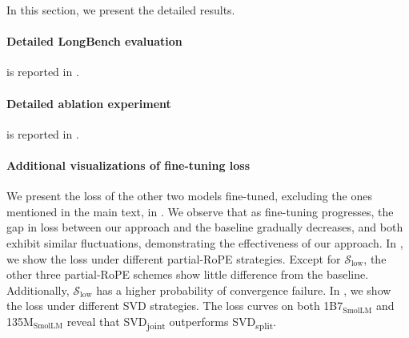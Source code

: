 
In this section, we present the detailed results. 
\paragraph{Detailed LongBench evaluation} is reported in .

\paragraph{Detailed ablation experiment} is reported in .

\paragraph{Additional visualizations of fine-tuning loss} 
We present the loss of the other two models fine-tuned, excluding the ones mentioned in the main text, in . 
We observe that as fine-tuning progresses, the gap in loss between our approach and the baseline gradually decreases, and both exhibit similar fluctuations, demonstrating the effectiveness of our approach. 
In , we show the loss under different partial-RoPE strategies. Except for $\mathcal{S}_{\text{low}}$, the other three partial-RoPE schemes show little difference from the baseline. Additionally, $\mathcal{S}_{\text{low}}$ has a higher probability of convergence failure. In , we show the loss under different SVD strategies. The loss curves on both 1B7$_{\text{SmolLM}}$ and 135M$_{\text{SmolLM}}$ reveal that SVD\textsubscript{joint} outperforms SVD\textsubscript{split}.



